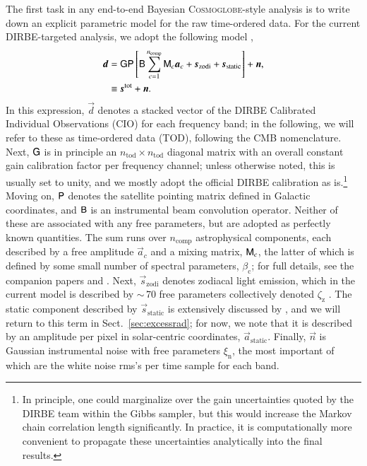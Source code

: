 \documentclass{aa}
\newcommand{\dv}[0]{\vec{d}}
\newcommand{\B}[0]{\tens{B}}
\newcommand{\G}[0]{\tens{G}}
\newcommand{\n}[0]{\vec{n}}
\newcommand{\s}[0]{\vec{s}}
\renewcommand{\a}[0]{\vec{a}}
\newcommand{\M}[0]{\tens{M}}
\renewcommand{\P}[0]{\tens{P}}
\newcommand{\cosmoglobe}{\textsc{Cosmoglobe}}
\begin{document}
The first task in any end-to-end Bayesian \cosmoglobe-style analysis
is to write down an explicit parametric model for the raw time-ordered
data. For the current DIRBE-targeted analysis, we adopt the following
model \citep{CG02_01},
\begin{align}
	\label{eq:model}
	\dv &=\G\P\left[\B\sum_{c=1}^{n_{\mathrm{comp}}}\M_c\a_c+\s_{\mathrm{zodi}} +
          \s_{\mathrm{static}}\right] + \n,\\
        &\equiv \s^{\mathrm{tot}} + \n.
\end{align}
In this expression, $\dv$ denotes a stacked vector of the DIRBE
Calibrated Individual Observations (CIO) for each frequency band; in
the following, we will refer to these as time-ordered data (TOD),
following the CMB nomenclature. Next, $\G$ is in principle an
$n_{\mathrm{tod}}\times n_{\mathrm{tod}}$ diagonal matrix with an
overall constant gain calibration factor per frequency channel; unless
otherwise noted, this is usually set to unity, and we mostly adopt the
official DIRBE calibration as is.\footnote{In principle, one could
marginalize over the gain uncertainties quoted by the DIRBE team
within the Gibbs sampler, but this would increase the Markov chain
correlation length significantly. In practice, it is computationally
more convenient to propagate these uncertainties analytically into the
final results.}  Moving on, $\P$ denotes the satellite pointing
matrix defined in Galactic coordinates, and $\B$ is an
instrumental beam convolution operator. Neither of these are
associated with any free parameters, but are adopted as perfectly
known quantities. The sum runs over $n_{\mathrm{comp}}$ astrophysical
components, each described by a free amplitude $\a_c$ and a mixing
matrix, $\M_c$, the latter of which is defined by some small number of
spectral parameters, $\beta_{\mathrm{c}}$; for full details, see
the companion papers \citet{CG02_04} and \citet{CG02_05}. Next, $\s_{\mathrm{zodi}}$ denotes zodiacal
light emission, which in the current model is described by $\sim$\,70
free parameters collectively denoted $\zeta_{\mathrm{z}}$
\citep{CG02_02}. The static component described by
$\s_{\mathrm{static}}$ is extensively discussed by \citet{CG02_01},
and we will return to this term in Sect.~\ref{sec:excessrad}; for now,
we note that it is described by an amplitude per pixel in
solar-centric coordinates, $\a_{\mathrm{static}}$. Finally, $\n$
is Gaussian instrumental noise with free parameters
$\xi_{\mathrm{n}}$, the most important of which are the white noise
rms's per time sample for each band.
\end{document}

